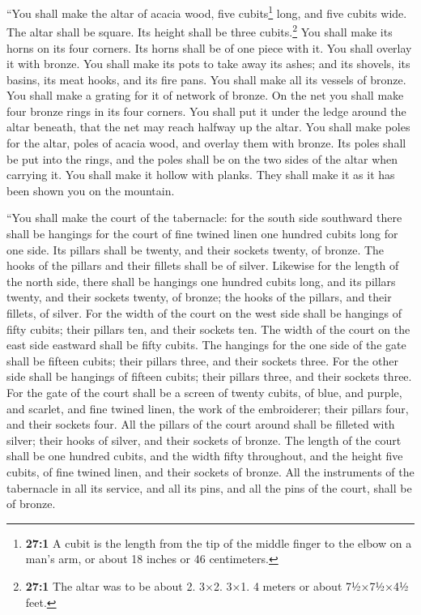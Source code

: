  ``You shall make the altar of acacia wood, five
cubits\footnote{\textbf{27:1} A cubit is the length from the tip of the
  middle finger to the elbow on a man's arm, or about 18 inches or 46
  centimeters.} long, and five cubits wide. The altar shall be square.
Its height shall be three cubits.\footnote{\textbf{27:1} The altar was
  to be about 2. 3×2. 3×1. 4 meters or about 7½×7½×4½ feet.}
 You shall make its horns on its four corners. Its horns
shall be of one piece with it. You shall overlay it with bronze.
 You shall make its pots to take away its ashes; and its
shovels, its basins, its meat hooks, and its fire pans. You shall make
all its vessels of bronze.  You shall make a grating for
it of network of bronze. On the net you shall make four bronze rings in
its four corners.  You shall put it under the ledge around
the altar beneath, that the net may reach halfway up the altar.
 You shall make poles for the altar, poles of acacia wood,
and overlay them with bronze.  Its poles shall be put into
the rings, and the poles shall be on the two sides of the altar when
carrying it.  You shall make it hollow with planks. They
shall make it as it has been shown you on the mountain.

 ``You shall make the court of the tabernacle: for the
south side southward there shall be hangings for the court of fine
twined linen one hundred cubits long for one side.  Its
pillars shall be twenty, and their sockets twenty, of bronze. The hooks
of the pillars and their fillets shall be of silver. 
Likewise for the length of the north side, there shall be hangings one
hundred cubits long, and its pillars twenty, and their sockets twenty,
of bronze; the hooks of the pillars, and their fillets, of silver.
 For the width of the court on the west side shall be
hangings of fifty cubits; their pillars ten, and their sockets ten.
 The width of the court on the east side eastward shall
be fifty cubits.  The hangings for the one side of the
gate shall be fifteen cubits; their pillars three, and their sockets
three.  For the other side shall be hangings of fifteen
cubits; their pillars three, and their sockets three. 
For the gate of the court shall be a screen of twenty cubits, of blue,
and purple, and scarlet, and fine twined linen, the work of the
embroiderer; their pillars four, and their sockets four. 
All the pillars of the court around shall be filleted with silver; their
hooks of silver, and their sockets of bronze.  The length
of the court shall be one hundred cubits, and the width fifty
throughout, and the height five cubits, of fine twined linen, and their
sockets of bronze.  All the instruments of the tabernacle
in all its service, and all its pins, and all the pins of the court,
shall be of bronze.

